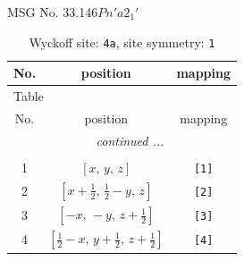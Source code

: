 \documentclass[fleqn,8pt]{jsarticle}
\begin{document}
\setcounter{MaxMatrixCols}{32}

\renewcommand{\tablename}{Table~}
\renewcommand{\figurename}{Figure~}
\begin{center}
\LARGE
MSG No. 33.146\quad$Pn'a2_{1}'$
\end{center}
\renewcommand{\arraystretch}{1.2}
\begin{longtable}{ccc}
\caption{Wyckoff site: {\tt 4a}, site symmetry: {\tt 1}}
 \\
 \hline \hline
No. & position & mapping \\ \hline \endfirsthead

\multicolumn{2}{l}{\tablename\ \thetable{}} \\
 \hline \hline
No. & position & mapping \\ \hline \endhead

 \hline \hline
\multicolumn{2}{r}{\footnotesize\it continued ...} \\ \endfoot

 \hline \hline
\multicolumn{2}{r}{} \\ \endlastfoot

1 & $\left[ x,\, y,\, z \right]$ & {\tt [1]} \\ \hline
2 & $\left[ x + \frac{1}{2},\, \frac{1}{2} - y,\, z \right]$ & {\tt [2]} \\ \hline
3 & $\left[ - x,\, - y,\, z + \frac{1}{2} \right]$ & {\tt [3]} \\ \hline
4 & $\left[ \frac{1}{2} - x,\, y + \frac{1}{2},\, z + \frac{1}{2} \right]$ & {\tt [4]} \\
\end{longtable}
\end{document}
